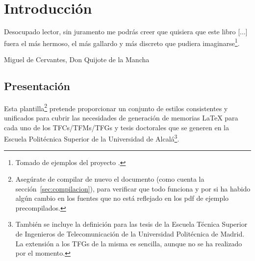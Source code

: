 % 
% 
% 
% 
% 
% 
% 
% 

\chapter{Introducción}
\label{cha:introduccion}

\begin{FraseCelebre}
  \begin{Frase}
    Desocupado lector, sin juramento me podrás creer que quisiera que este libro [...] fuera el más hermoso, el más gallardo y más discreto que pudiera imaginarse\footnote{Tomado de ejemplos del proyecto \texis{}.}.
  \end{Frase}
  \begin{Fuente}
    Miguel de Cervantes, Don Quijote de la Mancha
  \end{Fuente}
\end{FraseCelebre}


\section{Presentación}
\label{sec:presentacion}

Esta plantilla\footnote{Asegúrate de compilar de nuevo el documento (como cuenta la sección~\ref{sec:compilacion}), para verificar que todo funciona y por si ha habido algún cambio en los fuentes que no está reflejado en los pdf de ejemplo precompilados.} pretende proporcionar un conjunto de estilos consistentes y unificados para cubrir las necesidades de generación de memorias \LaTeX{} para cada uno de los TFCs/TFMs/TFGs y tesis doctorales que se generen en la Escuela Politécnica Superior de la Universidad de Alcalá\footnote{También se incluye la definición para las tesis de la Escuela Técnica Superior de Ingenieros de Telecomunicación de la Universidad Politécnica de Madrid. La extensión a los TFGs de la misma es sencilla, aunque no se ha realizado por el momento.}.

